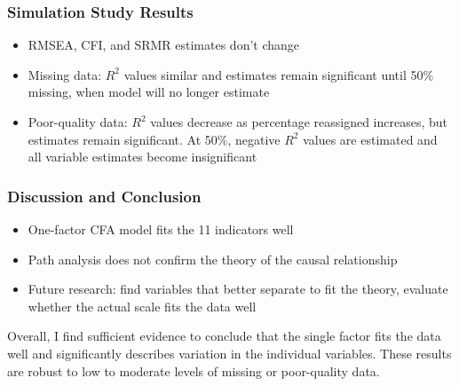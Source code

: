 \documentclass{beamer}
\begin{document}
\begin{frame}
\frametitle{Simulation Study Results}
\begin{itemize}
\item RMSEA, CFI, and SRMR estimates don't change
\item Missing data: $R^2$ values similar and estimates remain significant until 50\% missing, when model will no longer estimate
\item Poor-quality data: $R^2$ values decrease as percentage reassigned increases, but estimates remain significant. At 50\%, negative $R^2$ values are estimated and all variable estimates become insignificant
\end{itemize}
\end{frame} 

\begin{frame}
\frametitle{Discussion and Conclusion}
\begin{itemize}
\item One-factor CFA model fits the 11 indicators well
\item Path analysis does not confirm the theory of the causal relationship
\item Future research: find variables that better separate to fit the theory, evaluate whether the actual scale fits the data well
\end{itemize}
Overall, I find sufficient evidence to conclude that the single factor fits the data well and significantly describes variation in the individual variables. These results are robust to low to moderate levels of missing or poor-quality data. 
\end{frame}
\end{document}
